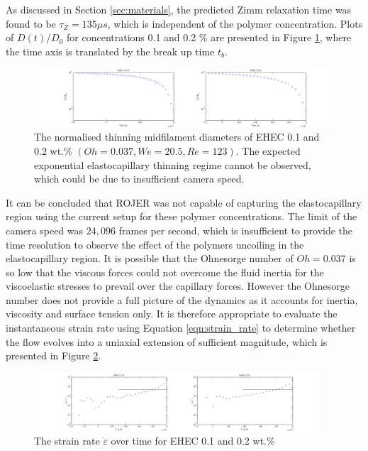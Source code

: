 \documentclass[11pt]{article}
\begin{document}
As discussed in Section \ref{sec:materials}, the predicted Zimm relaxation time 
was found to be $\tau_{Z} = 135 \mu s$, which is independent of the polymer 
concentration. Plots of $D(t)/D_0$ for concentrations 0.1 and 0.2 \% are 
presented in Figure \ref{fig:1_2_EHEC}, where the time axis is translated by 
the break up time $t_b$.
\begin{figure}[h]
	\begin{center}
		\includegraphics[scale = 0.45, trim = 7cm 0cm 6cm 0cm]{img/1_2_EHEC.png}
		\caption{The normalised thinning midfilament diameters of EHEC 0.1 and 
0.2 wt.\% $ \left(Oh = 0.037 , We = 20.5, Re = 123 \right)$. The expected 
exponential elastocapillary thinning regime cannot be observed, which could be 
due to insufficient camera speed.}
		\label{fig:1_2_EHEC}
	\end{center}
\end{figure}

It can be concluded that ROJER was not capable of capturing the elastocapillary 
region using the current setup for these polymer concentrations. The limit of 
the camera speed was $24,096$ frames per second, which is insufficient to 
provide the time resolution to observe the effect of the polymers uncoiling in 
the elastocapillary region. It is possible that the Ohnesorge number of $Oh = 
0.037$ is so low that the viscous forces could not overcome the fluid inertia 
for the viscoelastic stresses to prevail over the capillary forces. However the 
Ohnesorge number does not provide a full picture of the dynamics as it accounts 
for inertia, viscosity and surface tension only. It is therefore appropriate to 
evaluate the instantaneous strain rate using Equation \ref{eqn:strain_rate} to 
determine whether the flow evolves into a uniaxial extension of sufficient 
magnitude, which is presented in Figure \ref{fig:1_2_EHEC_strain}. 
\begin{figure}[h]
	\begin{center}
		\includegraphics[width=0.95\textwidth, trim = 7cm 0cm 6cm 0cm]{img/1_2_EHEC_strain.png}
		\caption{The strain rate $\dot{\varepsilon}$ over time for EHEC 0.1 and 
0.2 wt.\%}
		\label{fig:1_2_EHEC_strain}
	\end{center}
\end{figure}
\end{document}
